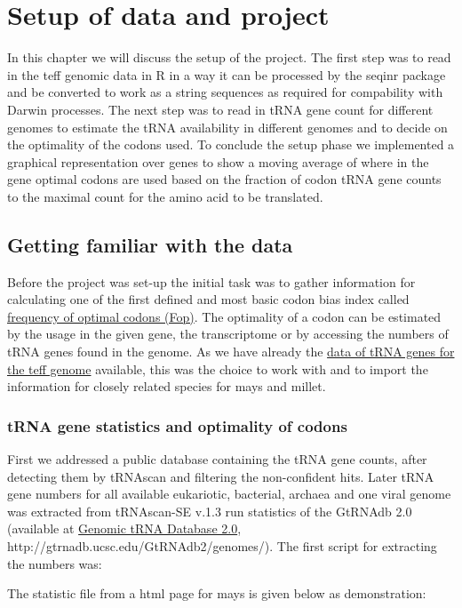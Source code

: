 \chapter{Setup of data and project}
In this chapter we will discuss the setup of the project. The first step was to read in the teff genomic data in R in a way it can be processed by the seqinr package and be converted to work as a string sequences as required for compability with Darwin processes. The next step was to read in tRNA gene count for different genomes to estimate the tRNA availability in different genomes and to decide on the optimality of the codons used. To conclude the setup phase we implemented a graphical representation over genes to show a moving average of where in the gene optimal codons are used based on the fraction of codon tRNA gene counts to the maximal count for the amino acid to be translated. 

\section{Getting familiar with the data}
Before the project was set-up the initial task was to gather information for calculating one of the first defined and most basic codon bias index called \hyperlink{function:Fop}{frequency of optimal codons (Fop)}. The optimality of a codon can be estimated by the usage in the given gene, the transcriptome or by accessing the numbers of tRNA genes found in the genome. As we have already the \hyperlink{data:tRNAlist}{data of tRNA genes for the teff genome} available, this was the choice to work with and to import the information for closely related species for mays and millet.

\subsection{tRNA gene statistics and optimality of codons}
First we addressed a public database containing the tRNA gene counts, after detecting them by tRNAscan and filtering the non-confident hits. Later tRNA gene numbers for all available eukariotic, bacterial, archaea and one viral genome was extracted from tRNAscan-SE v.1.3 run statistics of the GtRNAdb 2.0 (available at
\href{http://gtrnadb.ucsc.edu/GtRNAdb2/genomes/}{Genomic tRNA Database 2.0}, http://gtrnadb.ucsc.edu/GtRNAdb2/genomes/). \cite{Chan2016} %
The first script for extracting the numbers was:
  
The statistic file from a html page for mays is given below as demonstration: 
      
 
